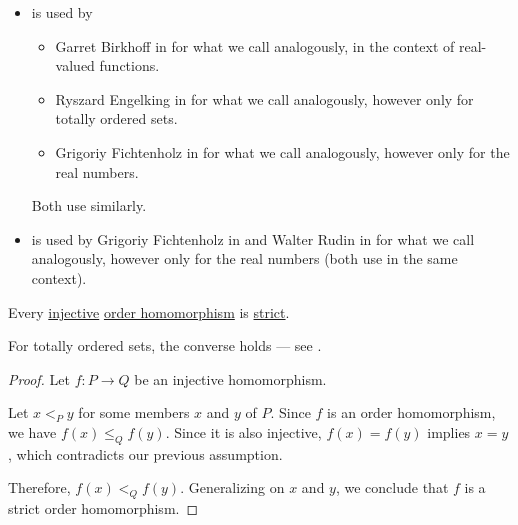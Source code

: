 \begin{remark}
\begin{itemize}
    \item {} is used by
    \begin{itemize}
      \item Garret Birkhoff in \cite[208]{Birkhoff1948} for what we call analogously, in the context of real-valued functions.
      \item Ryszard Engelking in \cite[8]{Engelking1989} for what we call analogously, however only for totally ordered sets.
      \item Grigoriy Fichtenholz in \cite[№47]{ФихтенгольцОсновыТом1} for what we call analogously, however only for the real numbers.
    \end{itemize}

    Both use  similarly.

    \item {} is used by Grigoriy Fichtenholz in \cite[№47]{ФихтенгольцОсновыТом1} and Walter Rudin in \cite[def. 4.28]{Rudin1976Principles} for what we call analogously, however only for the real numbers (both use  in the same context).
  \end{itemize}
\end{remark}

\begin{proposition}\label{thm:order_embedding_is_strict}
  Every \hyperref[def:function_invertibility/injective]{injective} \hyperref[def:order_homomorphism/increasing]{order homomorphism} is \hyperref[def:order_homomorphism/increasing]{strict}.
\end{proposition}
\begin{comments}
  \item For totally ordered sets, the converse holds --- see .
\end{comments}
\begin{proof}
  Let \( f: P \to Q \) be an injective homomorphism.

  Let \( x <_P y \) for some members \( x \) and \( y \) of \( P \). Since \( f \) is an order homomorphism, we have \( f(x) \leq_Q f(y) \). Since it is also injective, \( f(x) = f(y) \) implies \( x = y \), which contradicts our previous assumption.

  Therefore, \( f(x) <_Q f(y) \). Generalizing on \( x \) and \( y \), we conclude that \( f \) is a strict order homomorphism.
\end{proof}
